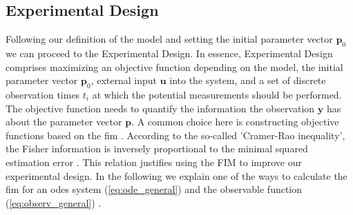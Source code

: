 \documentclass[10pt,A4paper]{article}
\newcommand{\mbu}{\mathbf{u}}
\newcommand{\mbp}{\mathbf{p}}
\newcommand{\mby}{\mathbf{y}}
\begin{document}
\subsection*{Experimental Design}
Following our definition of the model and setting the initial parameter vector $\mbp_0$ we can proceed to the Experimental Design.
In essence, Experimental Design comprises maximizing an objective function depending on the model, the initial parameter vector $\mbp_0$, external input $\mbu$ into the system, and a set of discrete observation times $t_i$ at which the potential measurements should be performed.
The objective function needs to quantify the information the observation $\mby$ has about the parameter vector $\mbp$.
A common choice here is constructing objective functions based on the \acf{fim} \cite{lyTutorialFisher2017}.
According to the so-called 'Cramer-Rao inequality', the Fisher information is inversely proportional to the minimal squared estimation error \cite{friedenExploratoryData2010}.
This relation justifies using the FIM to improve our experimental design.
In the following we explain one of the ways to calculate the \ac{fim} for an \acp{ode} system (\ref{eq:ode_general}) and the observable function (\ref{eq:observ_general}) \cite{lyTutorialFisher2017}.
%
%
\end{document}
